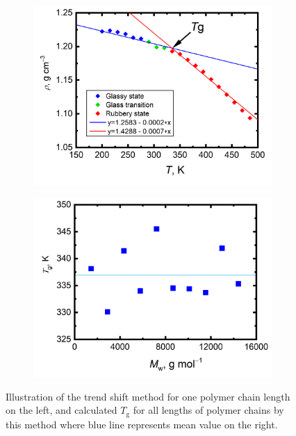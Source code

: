 \begin{figure}[H]
	\begin{subfigure}{0.5\textwidth}
		\includegraphics[width=1.0\linewidth]{img/vypocet_tg.png} 
	\end{subfigure}
	\begin{subfigure}{0.5\textwidth}
		\includegraphics[width=1.0\linewidth]{img/glass_temp.png} 
	\end{subfigure}   	
	\vspace{-1cm}
	\caption{Illustration of the trend shift method for one polymer chain length on the left, and calculated $T_\mathrm{g}$ for all lengths of polymer chains by this method where blue line represents mean value on the right.}
	\label{fig:glass}
\end{figure}

